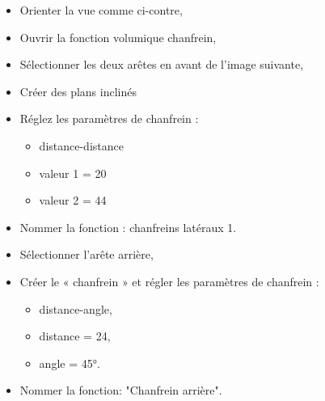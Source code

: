 \begin{minipage}{0.75\linewidth}
\begin{itemize}
 \item Orienter la vue comme ci-contre,
 \item Ouvrir la fonction volumique chanfrein,
 \item Sélectionner les deux arêtes en avant de l'image suivante,
 \item Créer des plans inclinés
 \item Réglez les paramètres de chanfrein :
 \begin{itemize}
  \item distance-distance
  \item valeur 1 = 20
  \item valeur 2 = 44
 \end{itemize}
 \item Nommer la fonction : chanfreins latéraux 1.
 \item Sélectionner l'arête arrière,
 \item Créer le « chanfrein » et régler les paramètres de chanfrein :
 \begin{itemize}
  \item distance-angle,
  \item distance = 24,
  \item angle = 45°.
 \end{itemize}
 \item Nommer la fonction: "Chanfrein arrière".  
\end{itemize}
\end{minipage}
\hfill
